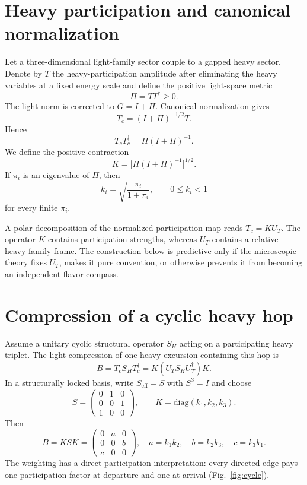 \documentclass[11pt]{article}
\theoremstyle{remark}\newtheorem{remark}{Remark}
\begin{document}
\section{Heavy participation and canonical normalization}
Let a three-dimensional light-family sector couple to a gapped heavy sector. Denote by $T$ the heavy-participation amplitude after eliminating the heavy variables at a fixed energy scale and define the positive light-space metric
\begin{equation}
\Pi = TT^\dagger\ge 0.
\end{equation}
The light norm is corrected to $G=I+\Pi$. Canonical normalization gives
\begin{equation}
T_c=(I+\Pi)^{-1/2}T.
\end{equation}
Hence
\begin{equation}
T_cT_c^\dagger=\Pi(I+\Pi)^{-1}.
\end{equation}
We define the positive contraction
\begin{equation}
K=\big[\Pi(I+\Pi)^{-1}\big]^{1/2}.
\label{eq:K}
\end{equation}
If $\pi_i$ is an eigenvalue of $\Pi$, then
\begin{equation}
k_i=\sqrt{\frac{\pi_i}{1+\pi_i}},\qquad 0\le k_i<1
\end{equation}
for every finite $\pi_i$.

A polar decomposition of the normalized participation map reads $T_c=KU_T$. The operator $K$ contains participation strengths, whereas $U_T$ contains a relative heavy-family frame. The construction below is predictive only if the microscopic theory fixes $U_T$, makes it pure convention, or otherwise prevents it from becoming an independent flavor compass.

\section{Compression of a cyclic heavy hop}
Assume a unitary cyclic structural operator $S_H$ acting on a participating heavy triplet. The light compression of one heavy excursion containing this hop is
\begin{equation}
B=T_cS_HT_c^\dagger=K(U_TS_HU_T^\dagger)K.
\end{equation}
In a structurally locked basis, write $S_{\mathrm{eff}}=S$ with $S^3=I$ and choose
\begin{equation}
S=\begin{pmatrix}0&1&0\\0&0&1\\1&0&0\end{pmatrix},\qquad K=\mathrm{diag}(k_1,k_2,k_3).
\end{equation}
Then
\begin{equation}
B=KSK=\begin{pmatrix}0&a&0\\0&0&b\\c&0&0\end{pmatrix},
\quad a=k_1k_2,\quad b=k_2k_3,\quad c=k_3k_1.
\label{eq:B}
\end{equation}
The weighting has a direct participation interpretation: every directed edge pays one participation factor at departure and one at arrival (Fig.~\ref{fig:cycle}).
\end{document}
